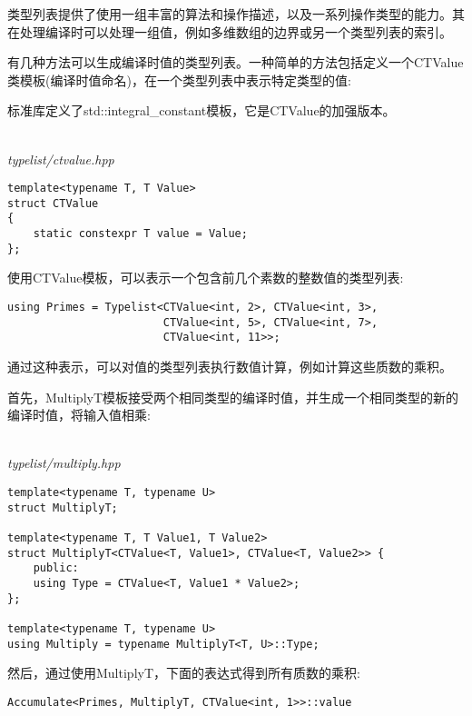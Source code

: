 
类型列表提供了使用一组丰富的算法和操作描述，以及一系列操作类型的能力。其在处理编译时可以处理一组值，例如多维数组的边界或另一个类型列表的索引。

有几种方法可以生成编译时值的类型列表。一种简单的方法包括定义一个CTValue类模板(编译时值命名)，在一个类型列表中表示特定类型的值:

\begin{tcolorbox}[colback=webgreen!5!white,colframe=webgreen!75!black]
\hspace*{0.75cm}标准库定义了std::integral\_constant模板，它是CTValue的加强版本。
\end{tcolorbox}

\hspace*{\fill} \\ %
\noindent
\textit{typelist/ctvalue.hpp}
\begin{lstlisting}[style=styleCXX]
template<typename T, T Value>
struct CTValue
{
	static constexpr T value = Value;
};
\end{lstlisting}

使用CTValue模板，可以表示一个包含前几个素数的整数值的类型列表:

\begin{lstlisting}[style=styleCXX]
using Primes = Typelist<CTValue<int, 2>, CTValue<int, 3>,
						CTValue<int, 5>, CTValue<int, 7>,
						CTValue<int, 11>>;
\end{lstlisting}

通过这种表示，可以对值的类型列表执行数值计算，例如计算这些质数的乘积。

首先，MultiplyT模板接受两个相同类型的编译时值，并生成一个相同类型的新的编译时值，将输入值相乘:

\hspace*{\fill} \\ %
\noindent
\textit{typelist/multiply.hpp}
\begin{lstlisting}[style=styleCXX]
template<typename T, typename U>
struct MultiplyT;

template<typename T, T Value1, T Value2>
struct MultiplyT<CTValue<T, Value1>, CTValue<T, Value2>> {
	public:
	using Type = CTValue<T, Value1 * Value2>;
};

template<typename T, typename U>
using Multiply = typename MultiplyT<T, U>::Type;
\end{lstlisting}

然后，通过使用MultiplyT，下面的表达式得到所有质数的乘积:

\begin{lstlisting}[style=styleCXX]
Accumulate<Primes, MultiplyT, CTValue<int, 1>>::value
\end{lstlisting}

